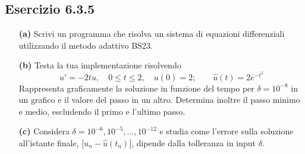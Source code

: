 \documentclass[letterpaper, 12pt]{article}
\numberwithin{equation}{section}    %
\begin{document}
\subsection{Esercizio 6.3.5}
\label{es:6_3_5}
\begin{itemize}
    \item[\textbf{(a)}] Scrivi un programma che risolva un sistema di equazioni differenziali utilizzando 
    il metodo adattivo BS23.
    \item[\textbf{(b)}] Testa la tua implementazione risolvendo
    \[
        u' = -2t u, \quad 0 \le t \le 2, \quad u(0) = 2; \qquad \hat{u}(t) = 2e^{-t^2}
    \]
    Rappresenta graficamente la soluzione in funzione del tempo per $\delta=10^{-8}$ in un grafico e il 
    valore del passo in un altro. Determina inoltre il passo minimo e medio, escludendo il primo e l'ultimo passo.
    \item[\textbf{(c)}] Considera $\delta=10^{-6},10^{-5},\ldots,10^{-12}$ e studia come l'errore sulla 
    soluzione all'istante finale, $|u_n-\hat{u}(t_n)|$, dipende dalla tolleranza in input $\delta$.
\end{itemize}
\end{document}
